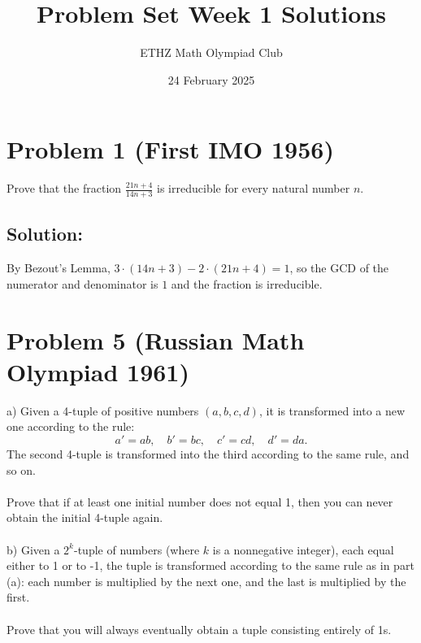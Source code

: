 \documentclass[11pt, a4paper, oneside]{article}
\title{Problem Set Week 1 Solutions}
\author{ETHZ Math Olympiad Club}
\date{24 February 2025}
\newcommand{\problem}[1][]{\section{#1} \hfill \par}
\newcommand{\solution}[1][]{\subsection*{#1}\hfill \par}
\theoremstyle{remark}
\theoremstyle{lemma}
\begin{document}
\maketitle

\problem[Problem 1 (First IMO 1956)]
Prove that the fraction \(\frac{21n+4}{14n+3}\) is irreducible for every natural number \(n\).

\solution[Solution:]
By Bezout's Lemma, $3 \cdot (14n+3) - 2 \cdot (21n + 4) = 1$, so the GCD of the numerator and denominator is $1$ and the fraction is irreducible.
\newpage
\problem[Problem 5 (Russian Math Olympiad 1961)]
a) Given a 4-tuple of positive numbers \((a,b,c,d)\), it is transformed into a new one according to the rule:
    \[
    a' = ab, \quad b' = bc, \quad c' = cd, \quad d' = da.
    \]
    The second 4-tuple is transformed into the third according to the same rule, and so on.
\\\\
Prove that if at least one initial number does not equal 1, then you can never obtain the initial 4-tuple again.
\\\\
b) Given a \(2^k\)-tuple of numbers (where \(k\) is a nonnegative integer), each equal either to 1 or to -1, the tuple is transformed according to the same rule as in part (a): each number is multiplied by the next one, and the last is multiplied by the first.
\\\\
Prove that you will always eventually obtain a tuple consisting entirely of 1s.
\end{document}
